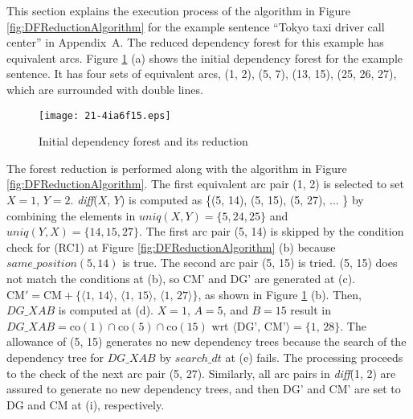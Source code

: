 \documentclass[english]{jnlp_1.4_rep}
\theoremstyle{break}
\theoremstyle{plain}
\theoremstyle{plain}
\begin{document}
This section explains the execution process of the algorithm in
Figure \ref{fig:DFReductionAlgorithm} for the example sentence ``Tokyo
taxi driver call center'' in Appendix~A. The
reduced dependency forest for this example has equivalent
arcs. Figure \ref{fig:IDFandRDFexample} (a) shows the initial dependency
forest for the example sentence. It has four sets of equivalent arcs,
(1, 2), (5, 7), (13, 15), (25, 26, 27), which are surrounded with double
lines.

\begin{figure}[t]
 \begin{center}
\texttt{[image: 21-4ia6f15.eps]}
 \end{center}
\caption{Initial dependency forest and its reduction}
\label{fig:IDFandRDFexample}
\end{figure}

The forest reduction is performed along with the algorithm in
Figure \ref{fig:DFReductionAlgorithm}. The first equivalent arc pair (1,
2) is selected to set $X=1$, $Y=2$. \textit{diff}($X$, $Y$) is computed as
\{(5, 14), (5, 15), (5, 27), ${\ldots}$ \} by combining the elements
in $\mathit{uniq}(X, Y)=\{5, 24, 25\}$ and $\mathit{uniq}(Y, X)=\{14, 15, 27\}$. The
first arc pair (5, 14) is skipped by the condition check for (RC1) at
Figure \ref{fig:DFReductionAlgorithm} (b) because $\mathit{same\_position}(5,
14)$ is true. The second arc pair (5, 15) is tried. (5, 15) does not
match the conditions at (b), so CM' and DG' are generated at
(c). $\mathrm{CM'}=\mathrm{CM}+\{\langle\text{1, 14}\rangle$, $\langle\text{1, 15}\rangle$, $\langle\text{1, 27}\rangle\}$, as shown in
Figure \ref{fig:IDFandRDFexample} (b). Then, $DG\_XAB$ is computed at
(d). $X=1$, $A=5$, and $B=15$ result in
$\mathit{DG\_XAB}=\mathrm{co}(1) \cap \mathrm{co}(5) \cap \mathrm{co}(15)$ wrt $\langle\text{DG', CM'}\rangle=\{\text{1,
28}\}$. The allowance of (5, 15) generates no new dependency trees
because the search of the dependency tree for $DG\_XAB$ by
$search\_dt$ at (e) fails. The processing proceeds to the check of the
next arc pair (5, 27). Similarly, all arc pairs in \textit{diff}(1, 2) are
assured to generate no new dependency trees, and then DG' and CM' are
set to DG and CM at (i), respectively.
\end{document}
